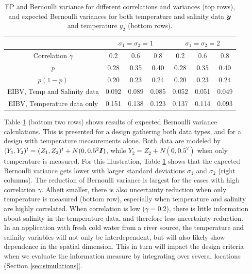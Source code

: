 \documentclass[aoas]{imsart}
\begin{document}
\begin{table}[!h] \centering \caption{EP and Bernoulli variance for
    different correlations and variances (top rows), and expected
    Bernoulli variances for both temperature and salinity data ${\boldsymbol y}$ and 
    temperature $y_2$ (bottom rows).}
  \begin{tabular}{c|ccc|ccc}
 &\multicolumn{3}{c}{$\sigma_1=\sigma_2=1$} & \multicolumn{3}{c}{$\sigma_1=\sigma_2=2$} \\
\hline
Correlation $\gamma$ & 0.2 & 0.6 & 0.8 & 0.2 & 0.6 & 0.8 \\
\hline
$p$ & 0.28 & 0.35 & 0.40 & 0.28 & 0.35 & 0.40 \\ 
$p(1-p)$ & 0.20 & 0.23 & 0.24 & 0.20 & 0.23 & 0.24 \\ 
EIBV, Temp and Salinity data & 0.092 & 0.089 & 0.085 & 0.052 & 0.051 & 0.049 \\ 
EIBV, Temperature data only & 0.151 & 0.138 & 0.123 & 0.137 & 0.114 & 0.093 \\ 
\hline
\end{tabular}
\label{tab:sim_rhoab}
\end{table}

Table \ref{tab:sim_rhoab} (bottom two rows) shows results of expected
Bernoulli variance calculations. This is presented for a design
gathering both data types, and for a design with
temperature measurements alone. Both data are modeled by $(Y_1,Y_2)^t=(Z_1,Z_2)^t+N(0,0.5^2{\boldsymbol I})$, while
$Y_2=Z_2+N(0,0.5^2)$ when only temperature is measured.  For this
illustration, Table \ref{tab:sim_rhoab} shows that the expected
Bernoulli variance gets lower with larger standard deviations
$\sigma_1$ and $\sigma_2$ (right columns). The reduction of Bernoulli
variance is largest for the cases with high correlation
$\gamma$. Albeit smaller, there is also uncertainty reduction when
only temperature is measured (bottom row), especially when temperature
and salinity are highly correlated. When correlation is low
($\gamma=0.2$), there is little information about salinity in the
temperature data, and therefore less uncertainty reduction. In an
application with fresh cold water from a river source, the temperature
and salinity variables will not only be interdependent, but will also
likely show dependence in the spatial dimension. This in turn will
impact the design criteria when we evaluate the information measure by
integrating over several locations (Section \ref{sec:simulations}).

\end{document}
